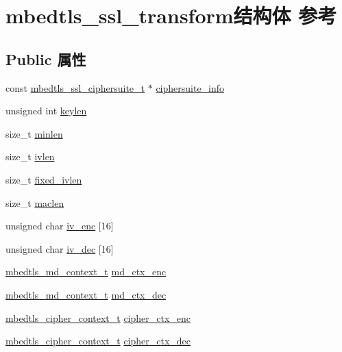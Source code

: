 \hypertarget{structmbedtls__ssl__transform}{}\section{mbedtls\+\_\+ssl\+\_\+transform结构体 参考}
\label{structmbedtls__ssl__transform}
\subsection*{Public 属性}
\begin{DoxyCompactItemize}
\item 
const \hyperlink{structmbedtls__ssl__ciphersuite__t}{mbedtls\+\_\+ssl\+\_\+ciphersuite\+\_\+t} $\ast$ \hyperlink{structmbedtls__ssl__transform_a669b64ca817f92c2f2da4531745b5563}{ciphersuite\+\_\+info}
\item 
unsigned int \hyperlink{structmbedtls__ssl__transform_aacb827d7f8a0d31359870c64d213baa9}{keylen}
\item 
size\+\_\+t \hyperlink{structmbedtls__ssl__transform_aaa43c099c7bc4f20f283362fd2feb619}{minlen}
\item 
size\+\_\+t \hyperlink{structmbedtls__ssl__transform_aabfe6c0fea0a8bcaa89823c2f06d885a}{ivlen}
\item 
size\+\_\+t \hyperlink{structmbedtls__ssl__transform_aeb9dc8aee94effb34d725e259e390c2d}{fixed\+\_\+ivlen}
\item 
size\+\_\+t \hyperlink{structmbedtls__ssl__transform_a2b616bec2cc218b736dffe87e58efc56}{maclen}
\item 
unsigned char \hyperlink{structmbedtls__ssl__transform_a5dc42f2d1f720d396c35eb355cba69e2}{iv\+\_\+enc} \mbox{[}16\mbox{]}
\item 
unsigned char \hyperlink{structmbedtls__ssl__transform_ad31f126ea147ffa513cc4ad170d2ff25}{iv\+\_\+dec} \mbox{[}16\mbox{]}
\item 
\hyperlink{structmbedtls__md__context__t}{mbedtls\+\_\+md\+\_\+context\+\_\+t} \hyperlink{structmbedtls__ssl__transform_a17f516488ea4254947d296a53c527af8}{md\+\_\+ctx\+\_\+enc}
\item 
\hyperlink{structmbedtls__md__context__t}{mbedtls\+\_\+md\+\_\+context\+\_\+t} \hyperlink{structmbedtls__ssl__transform_a9d9d8245fb1000d30a9a63191cddf0e0}{md\+\_\+ctx\+\_\+dec}
\item 
\hyperlink{structmbedtls__cipher__context__t}{mbedtls\+\_\+cipher\+\_\+context\+\_\+t} \hyperlink{structmbedtls__ssl__transform_a4a1c49f6f40086491dd8dd059f163a61}{cipher\+\_\+ctx\+\_\+enc}
\item 
\hyperlink{structmbedtls__cipher__context__t}{mbedtls\+\_\+cipher\+\_\+context\+\_\+t} \hyperlink{structmbedtls__ssl__transform_a8f7e9c4b90dda8083df54037e5be955e}{cipher\+\_\+ctx\+\_\+dec}
\end{DoxyCompactItemize}



